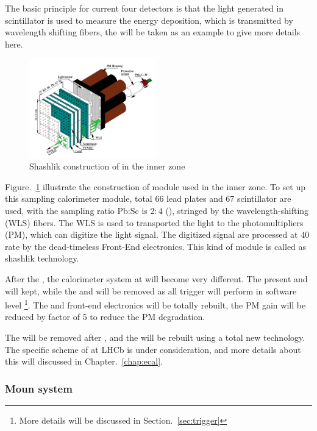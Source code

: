 The basic principle for current four detectors is 
that the light generated in scintillator is used to measure the energy deposition, 
which is transmitted by wavelength shifting fibers,
the \ecal will be taken as an example to give more details here.

\begin{figure}[!hbtp]
\centering
\includegraphics[width=0.49\textwidth]{Figures/02_Detector/Shashlik}%
\caption{ Shashlik construction of \ecal in the inner zone\supercite{Machikhiliyan_2009}}
\label{fig:Shashlik}
\end{figure}

Figure.~\ref{fig:Shashlik} illustrate the construction of \ecal module used in the inner zone.
To set up this sampling calorimeter module, 
total 66 lead plates and 67 scintillator are used,
with the sampling ratio Pb:Sc is $2:4$ (\mm),
stringed by the wavelength-shifting (WLS) fibers.
The WLS is used to transported the light to the photomultipliers (PM),
which can digitize the light signal.
The digitized signal are processed at 40 \mhz rate by the dead-timeless Front-End electronics.
This kind of module is called as shashlik technology.


After the \upgradeone,
the calorimeter system at \lhcb will become very different.
The present \ecal and \hcal will kept,
while the \presh and \spd will be removed as all trigger will perform in software level
\footnote{More details will be discussed in Section.~\ref{sec:trigger}}.
The \ecal and \hcal front-end electronics will be totally rebuilt,
the PM gain will be reduced by factor of 5 to reduce the PM degradation\supercite{LHCb-TDR-014}.

The \hcal will be removed after \upgradetwo,
and the \ecal will be rebuilt using a total new technology.
The specific scheme of \ecal at LHCb is under consideration,
and more details about this will discussed in Chapter.~\ref{chap:ecal}.




\subsubsection{Moun system}

